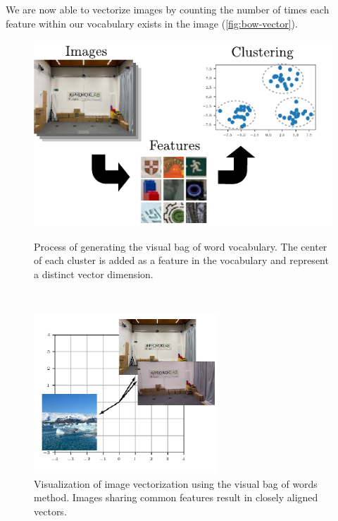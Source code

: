 We are now able to vectorize images by counting the number of times each feature within our vocabulary exists in the image (\autoref{fig:bow-vector}).

\begin{figure}[h]
    \captionsetup{format=plain}
    \begin{minipage}[t]{0.55\linewidth}
        \centering
        \includegraphics[width=\linewidth]{figures/bow_vocab.pdf}

        \caption{Process of generating the visual bag of word vocabulary. The center of each cluster is added as a feature in the vocabulary and represent a distinct vector dimension.}
        \label{fig:bow-vocab}
    \end{minipage}\hfill%
    ~
    \begin{minipage}[t]{0.4\linewidth}
        \centering
        \includegraphics[width=\linewidth]{figures/bow.pdf}
        \caption{Visualization of image vectorization using the visual bag of words method. Images sharing common features result in closely aligned vectors.}
        \label{fig:bow-vector}
    \end{minipage}
\end{figure}

